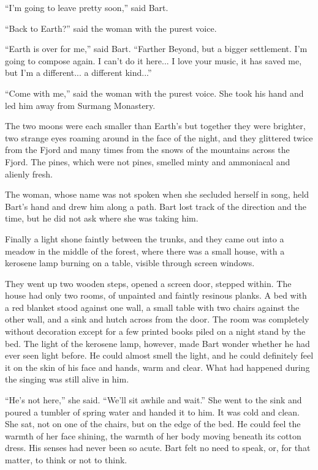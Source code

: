 \documentclass[english,11pt,letterpaper,onecolumn]{scrbook}
\begin{document}
	``I'm going to leave pretty soon,'' said Bart.

	``Back to Earth?'' said the woman with the purest voice.

	``Earth is over for me,'' said Bart. ``Farther Beyond, but a bigger settlement. I'm going to compose again. I can't do it here... I love your music, it has saved me, but I'm a different... a different kind...''

	``Come with me,'' said the woman with the purest voice. She took his hand and led him away from Surmang Monastery.

	The two moons were each smaller than Earth's but together they were brighter, two strange eyes roaming around in the face of the night, and they glittered twice from the Fjord and many times from the snows of the mountains across the Fjord. The pines, which were not pines, smelled minty and ammoniacal and alienly fresh.

	The woman, whose name was not spoken when she secluded herself in song, held Bart's hand and drew him along a path.  Bart lost track of the direction and the time, but he did not ask where she was taking him.

	Finally a light shone faintly between the trunks, and they came out into a meadow in the middle of the forest, where there was a small house, with a kerosene lamp burning on a table, visible through screen windows.

	They went up two wooden steps, opened a screen door, stepped within.  The house had only two rooms, of unpainted and faintly resinous planks.  A bed with a red blanket stood against one wall, a small table with two chairs against the other wall, and a sink and hutch across from the door.  The room was completely without decoration except for a few printed books piled on a night stand by the bed.  The light of the kerosene lamp, however, made Bart wonder whether he had ever seen light before.  He could almost smell the light, and he could definitely feel it on the skin of his face and hands, warm and clear.  What had happened during the singing was still alive in him.

	``He's not here,'' she said.  ``We'll sit awhile and wait.''  She went to the sink and poured a tumbler of spring water and handed it to him.  It was cold and clean.  She sat, not on one of the chairs, but on the edge of the bed.  He could feel the warmth of her face shining, the warmth of her body moving beneath its cotton dress.  His senses had never been so acute.  Bart felt no need to speak, or, for that matter, to think or not to think.
\end{document}
